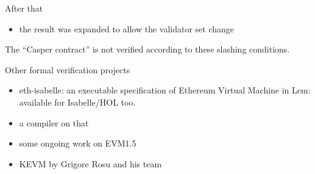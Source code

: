 \documentclass{beamer}
\begin{document}
\begin{frame}{After that}
  \begin{itemize}
  \item the result was expanded to allow the validator set change
  \end{itemize}

  The ``Casper contract'' is not verified according to these slashing conditions.
\end{frame}

\begin{frame}{Other formal verification projects}
\begin{itemize}
\item eth-isabelle: an executable specification of Ethereum Virtual Machine in Lem: available for Isabelle/HOL too.
\item a compiler on that
\item some ongoing work on EVM1.5
\item KEVM by Grigore Rosu and his team
\end{itemize}
\end{frame}
\end{document}
